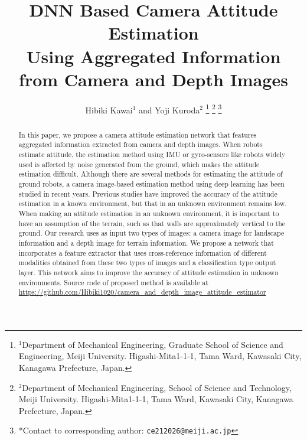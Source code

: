 \documentclass[a4paper, 10pt, conference]{ieeeconf}      %
\title{\LARGE \bf
DNN Based Camera Attitude Estimation \\ Using Aggregated Information from Camera and Depth Images
}
\author{Hibiki Kawai$^{1}$ and Yoji Kuroda$^{2}$%
\thanks{$^{1}$Department of Mechanical Engineering, Graduate School of Science and Engineering, Meiji University. Higashi-Mita1-1-1, Tama Ward, Kawasaki City, Kanagawa Prefecture, Japan.
}
\thanks{$^{2}$Department of Mechanical Engineering, School of Science and Technology, Meiji University. Higashi-Mita1-1-1, Tama Ward, Kawasaki City, Kanagawa Prefecture, Japan.
}
\thanks{*Contact to corresponding author:
        {\tt\small ce212026@meiji.ac.jp}}}%
\begin{document}
\maketitle
\thispagestyle{empty}
\pagestyle{empty}


\begin{abstract}

In this paper, we propose a camera attitude estimation network that features aggregated information extracted from camera and depth images. When robots estimate attitude, the estimation method using IMU or gyro-sensors like robots widely used is affected by noise generated from the ground, which makes the attitude estimation difficult. Although there are several methods for estimating the attitude of ground robots, a camera image-based estimation method using deep learning has been studied in recent years. Previous studies have improved the accuracy of the attitude estimation in a known environment, but that in an unknown environment remains low. When making an attitude estimation in an unknown environment, it is important to have an assumption of the terrain, such as that walls are approximately vertical to the ground. Our research uses as input two types of images: a camera image for landscape information and a depth image for terrain information. We propose a network that incorporates a feature extractor that uses cross-reference information of different modalities obtained from these two types of images and a classification type output layer. This network aims to improve the accuracy of attitude estimation in unknown environments. Source code of proposed method is available at \url{https://github.com/Hibiki1020/camera_and_depth_image_attitude_estimator}

\end{abstract}

\end{document}
